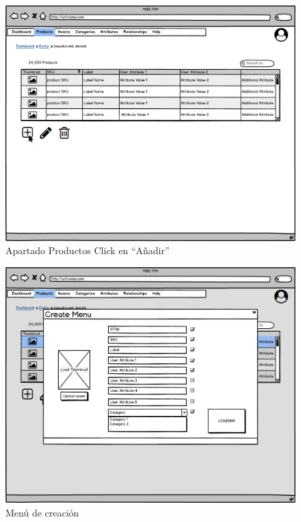 \begin{figure}[H]
    \includegraphics[width=1\linewidth]{mockups/RF2.1_boceto1.png}
    \caption{Apartado Productos Click en “Añadir”}
   \end{figure}
\vspace{1.0cm}

\begin{figure}[H]
    \includegraphics[width=1\linewidth]{mockups/RF2.1_bocetoCreacionV2.png}
    \caption{Menú de creación}
   \end{figure}
\vspace{1.0cm}

\newpage %